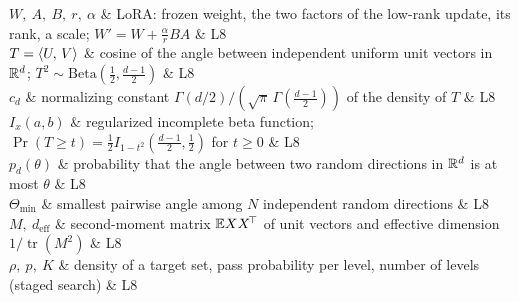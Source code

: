 \begin{notationchunk}
$W,\ A,\ B,\ r,\ \alpha$ & LoRA: frozen weight, the two factors of the low-rank update, its rank, a scale; $W'=W+\frac{\alpha}{r}BA$ & L8\\
$T=\left\langle U,\,V\right\rangle$ & cosine of the angle between independent uniform unit vectors in $\mathbb{R}^d$; $T^2\sim\mathrm{Beta}(\frac12,\frac{d-1}2)$ & L8\\
$c_d$ & normalizing constant $\Gamma(d/2)/(\sqrt\pi\,\Gamma(\frac{d-1}2))$ of the density of $T$ & L8\\
$I_x(a,b)$ & regularized incomplete beta function; $\Pr(T\ge t)=\frac12I_{1-t^2}(\frac{d-1}2,\frac12)$ for $t\ge0$ & L8\\
$p_d(\theta)$ & probability that the angle between two random directions in $\mathbb{R}^d$ is at most $\theta$ & L8\\
$\Theta_{\min}$ & smallest pairwise angle among $N$ independent random directions & L8\\
$M,\ d_{\mathrm{eff}}$ & second-moment matrix $\mathbb{E} XX^{\!\top}$ of unit vectors and effective dimension $1/\operatorname{tr}(M^2)$ & L8\\
$\rho,\ p,\ K$ & density of a target set, pass probability per level, number of levels (staged search) & L8\\
\end{notationchunk}

\normalsize


